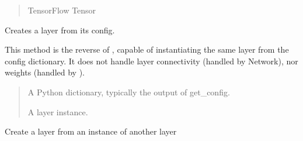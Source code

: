 \documentclass[letterpaper,10pt,english]{sphinxmanual}
\begin{document}
\begin{fulllineitems}
\begin{fulllineitems}
\begin{quote}
\begin{description}
\sphinxAtStartPar
TensorFlow Tensor

\end{description}\end{quote}

\end{fulllineitems}


\begin{fulllineitems}
\label{\detokenize{beyondml.tflow.layers:beyondml.tflow.layers.SparseConv3D.SparseConv3D.from_config}}
\pysigstartsignatures
{}
\pysigstopsignatures
\sphinxAtStartPar
Creates a layer from its config.

\sphinxAtStartPar
This method is the reverse of ,
capable of instantiating the same layer from the config
dictionary. It does not handle layer connectivity
(handled by Network), nor weights (handled by ).
\begin{quote}\begin{description}
\sphinxAtStartPar
{} \textendash{} A Python dictionary, typically the
output of get\_config.

\sphinxAtStartPar
A layer instance.

\end{description}\end{quote}

\end{fulllineitems}


\begin{fulllineitems}
\label{\detokenize{beyondml.tflow.layers:beyondml.tflow.layers.SparseConv3D.SparseConv3D.from_layer}}
\pysigstartsignatures
{}
\pysigstopsignatures
\sphinxAtStartPar
Create a layer from an instance of another layer


\end{fulllineitems}
\end{fulllineitems}
\end{document}
